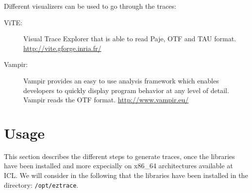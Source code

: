 Different visualizers can be used to go through the traces:
\begin{description}
\item[{\sc ViTE}:] Visual Trace Explorer that is able to read Paje,
  OTF and TAU format.\newline
  \url{http://vite.gforge.inria.fr/}
\item[{\sc Vampir}:] Vampir provides an easy to use analysis framework
  which enables developers to quickly display program behavior at any
  level of detail. Vampir reads the OTF format.\newline
  \url{http://www.vampir.eu/}
\end{description}

\section{Usage}

This section describes the different steps to generate traces, once
the libraries have been installed and more expecially on x86\_64
architectures available at ICL. We will consider in the following that
the libraries have been installed in the directory: \texttt{/opt/eztrace}.

